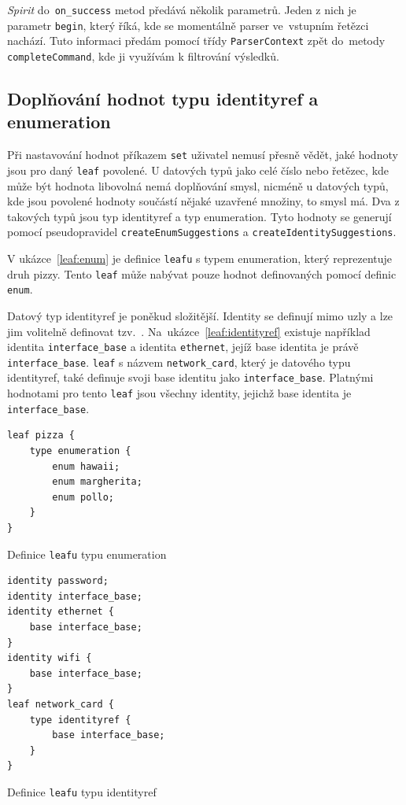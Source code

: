 \documentclass[thesis=B,czech,hidelinks]{FITthesis}[2019/03/06]
\begin{document}
\begin{enumerate}
        \textit{Spirit} do~\texttt{on\_success} metod předává několik parametrů. Jeden z nich je parametr \texttt{begin}, který říká, kde se momentálně parser ve~vstupním řetězci nachází. Tuto informaci předám pomocí třídy \texttt{ParserContext} zpět do~metody \texttt{completeCommand}, kde ji využívám k filtrování výsledků.
\end{enumerate}

\subsection{Doplňování hodnot typu identityref a enumeration}
Při nastavování hodnot příkazem \texttt{set} uživatel nemusí přesně vědět, jaké hodnoty jsou pro daný \texttt{leaf} povolené. U datových typů jako celé číslo nebo řetězec, kde může být hodnota libovolná nemá doplňování smysl, nicméně u datových typů, kde jsou povolené hodnoty součástí nějaké uzavřené množiny, to smysl má. Dva z takových typů jsou typ identityref a typ enumeration. Tyto hodnoty se generují pomocí pseudopravidel \texttt{createEnumSuggestions} a \texttt{createIdentitySuggestions}.

V ukázce~\ref{leaf:enum} je definice \texttt{leafu} s typem enumeration, který reprezentuje druh pizzy. Tento \texttt{leaf} může nabývat pouze hodnot definovaných pomocí definic \texttt{enum}.

Datový typ identityref je poněkud složitější. Identity se definují mimo uzly a lze jim volitelně definovat tzv.\ . Na~ukázce~\ref{leaf:identityref} existuje například identita \texttt{interface\_base} a identita \texttt{ethernet}, jejíž base identita je právě \texttt{interface\_base}. \texttt{leaf} s názvem \texttt{network\_card}, který je datového typu identityref, také definuje svoji base identitu jako \texttt{interface\_base}. Platnými hodnotami pro tento \texttt{leaf} jsou všechny identity, jejichž base identita je \texttt{interface\_base}.

\begin{listing}[H]
        \begin{verbatim}
leaf pizza {
    type enumeration {
        enum hawaii;
        enum margherita;
        enum pollo;
    }
}
\end{verbatim}
\caption{Definice \texttt{leafu} typu enumeration}\label{leaf:enum}
\end{listing}

\begin{listing}[H]
\begin{verbatim}
identity password;
identity interface_base;
identity ethernet {
    base interface_base;
}
identity wifi {
    base interface_base;
}
leaf network_card {
    type identityref {
        base interface_base;
    }
}
\end{verbatim}
\caption{Definice \texttt{leafu} typu identityref}\label{leaf:identityref}
\end{listing}
\end{document}
